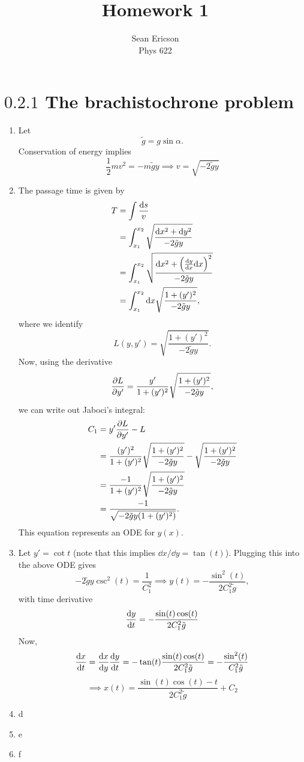 \documentclass[12pt]{article}
\begin{document}
\title{Homework 1}
\author{Sean Ericson \\ Phys 622}
\maketitle

\section*{$0.2.1$ The brachistochrone problem}
\begin{enumerate}[label=(\alph*)]
    \item Let
    \[ \tilde{g} = g\sin\alpha. \]
    Conservation of energy implies 
    \[ \frac{1}{2}mv^2 = -m\tilde{g}y \implies \boxed{v = \sqrt{-2\tilde{g}y}} \]

    \item The passage time is given by
    \begin{align*}
        T &= \int \frac{\dd s}{v} \\
        &= \int_{x_1}^{x_2}\sqrt{\frac{\dd x^2 + \dd y^2}{-2\tilde{g}y}} \\
        &= \int_{x_1}^{x_2}\sqrt{\frac{\dd x^2 + \left(\dv{y}{x} \dd x\right)^2}{-2\tilde{g}y}} \\
        &= \int_{x_1}^{x_2}\dd x \sqrt{\frac{1 + (y')^2}{-2\tilde{g}y}},
    \end{align*}
    where we identify
    \[ L(y, y') = \sqrt{\frac{1 + (y')^2}{-2\tilde{g}y}}. \]
    Now, using the derivative
    \[ \pdv{L}{y'} = \frac{y'}{1 + (y')^2}\sqrt{\frac{1 + (y')^2}{-2\tilde{g}y}}, \]
    we can write out Jaboci's integral:
    \begin{align*}
        C_1 &= y'\pdv{L}{y'} - L \\
        &= \frac{(y')^2}{1 + (y')^2}\sqrt{\frac{1 + (y')^2}{-2\tilde{g}y}} - \sqrt{\frac{1 + (y')^2}{-2\tilde{g}y}} \\
        &= \frac{-1}{1 + (y')^2}\sqrt{\frac{1 + (y')^2}{-2\tilde{g}y}} \\
        &= \frac{-1}{\sqrt{-2\tilde{g}y(1 + (y')^2)}}.
    \end{align*}
    This equation represents an ODE for $y(x)$.

    \item Let $y' = \cot t$ (note that this implies $\dd x/ \dd y = \tan(t)$). Plugging this into the above ODE gives
    \[ -2\tilde{g}y\csc^2(t) = \frac{1}{C_1^2} \implies \boxed{y(t) = -\frac{\sin^2(t)}{2C_1^2\tilde{g}}}, \]
    with time derivative
    \[ \dv{y}{t} = -\frac{\sin(t)\cos(t)}{2C_1^2\tilde{g}} \]
    Now, 
    \[ \dv{x}{t} = \dv{x}{y}\dv{y}{t} = -\tan(t)\frac{\sin(t)\cos(t)}{2C_1^2\tilde{g}} = -\frac{\sin^2(t)}{C_1^2\tilde{g}} \]
    \[ \implies \boxed{x(t) = \frac{\sin(t)\cos(t) - t}{2C_1^2\tilde{g}} + C_2} \]
    
    \item d
    \item e
    \item f
\end{enumerate}
\end{document}
